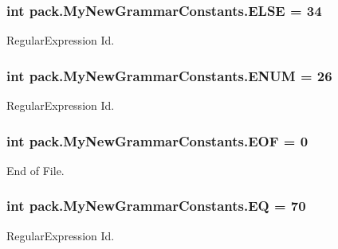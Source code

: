 \subsubsection[{\texorpdfstring{E\+L\+SE}{ELSE}}]{\setlength{\rightskip}{0pt plus 5cm}int pack.\+My\+New\+Grammar\+Constants.\+E\+L\+SE = 34}\hypertarget{interfacepack_1_1_my_new_grammar_constants_a815ef7b521bbb1a92ccf4767e7f16e12}{}\label{interfacepack_1_1_my_new_grammar_constants_a815ef7b521bbb1a92ccf4767e7f16e12}
Regular\+Expression Id. 
\subsubsection[{\texorpdfstring{E\+N\+UM}{ENUM}}]{\setlength{\rightskip}{0pt plus 5cm}int pack.\+My\+New\+Grammar\+Constants.\+E\+N\+UM = 26}\hypertarget{interfacepack_1_1_my_new_grammar_constants_ab27befd909f0a8a9ad84fd7acd40a311}{}\label{interfacepack_1_1_my_new_grammar_constants_ab27befd909f0a8a9ad84fd7acd40a311}
Regular\+Expression Id. 
\subsubsection[{\texorpdfstring{E\+OF}{EOF}}]{\setlength{\rightskip}{0pt plus 5cm}int pack.\+My\+New\+Grammar\+Constants.\+E\+OF = 0}\hypertarget{interfacepack_1_1_my_new_grammar_constants_a9a3ca6486cb7e82efdf80605f6cf85f3}{}\label{interfacepack_1_1_my_new_grammar_constants_a9a3ca6486cb7e82efdf80605f6cf85f3}
End of File. 
\subsubsection[{\texorpdfstring{EQ}{EQ}}]{\setlength{\rightskip}{0pt plus 5cm}int pack.\+My\+New\+Grammar\+Constants.\+EQ = 70}\hypertarget{interfacepack_1_1_my_new_grammar_constants_acfe9046161f9fa6a160131f770ef0fb5}{}\label{interfacepack_1_1_my_new_grammar_constants_acfe9046161f9fa6a160131f770ef0fb5}
Regular\+Expression Id. 
